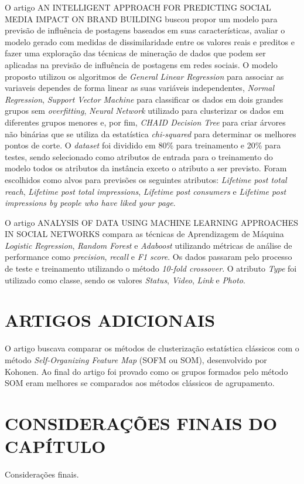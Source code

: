 O artigo AN INTELLIGENT APPROACH FOR PREDICTING SOCIAL MEDIA IMPACT ON BRAND BUILDING buscou propor um modelo para previsão de influência de postagens baseados em suas características, avaliar o modelo gerado com medidas de dissimilaridade entre os valores reais e preditos e fazer uma exploração das técnicas de mineração de dados que podem ser aplicadas na previsão de influência de postagens em redes sociais. O modelo proposto utilizou os algoritmos de \textit{General Linear Regression} para associar as variaveis dependes de forma linear as suas variáveis independentes, \textit{Normal Regression}, \textit{Support Vector Machine} para classificar os dados em dois grandes grupos sem \textit{overfitting}, \textit{Neural Network} utilizado para clusterizar os dados em diferentes grupos menores e, por fim, \textit{CHAID Decision Tree} para criar árvores não binárias que se utiliza da estatística \textit{chi-squared} para determinar os melhores pontos de corte. O \textit{dataset} foi dividido em 80\% para treinamento e 20\% para testes, sendo selecionado como atributos de entrada para o treinamento do modelo todos os atributos da instância exceto o atributo a ser previsto. Foram escolhidos como alvos para previsões os seguintes atributos: \textit{Lifetime post total reach}, \textit{Lifetime post total impressions}, \textit{Lifetime post consumers} e \textit{Lifetime post impressions by people who have liked your page}.

O artigo ANALYSIS OF DATA USING MACHINE LEARNING APPROACHES IN SOCIAL NETWORKS compara as técnicas de Aprendizagem de Máquina \textit{Logistic Regression}, \textit{Random Forest} e \textit{Adaboost} utilizando métricas de análise de performance como \textit{precision}, \textit{recall} e \textit{F1 score}. Os dados passaram pelo processo de teste e treinamento utilizando o método \textit{10-fold crossover}. O atributo \textit{Type} foi utilizado como classe, sendo os valores \textit{Status}, \textit{Video}, \textit{Link} e \textit{Photo}.

\section{ARTIGOS ADICIONAIS}

O artigo \cite{ultsch1995self} buscava comparar os métodos de clusterização estatística clássicos com o método \textit{Self-Organizing Feature Map} (SOFM ou SOM), desenvolvido por Kohonen. Ao final do artigo foi provado como os grupos formados pelo método SOM eram melhores se comparados aos métodos clássicos de agrupamento.

\section{CONSIDERAÇÕES FINAIS DO CAPÍTULO}
\label{sec:consideracoesFinaisRevisao}
Considerações finais.
